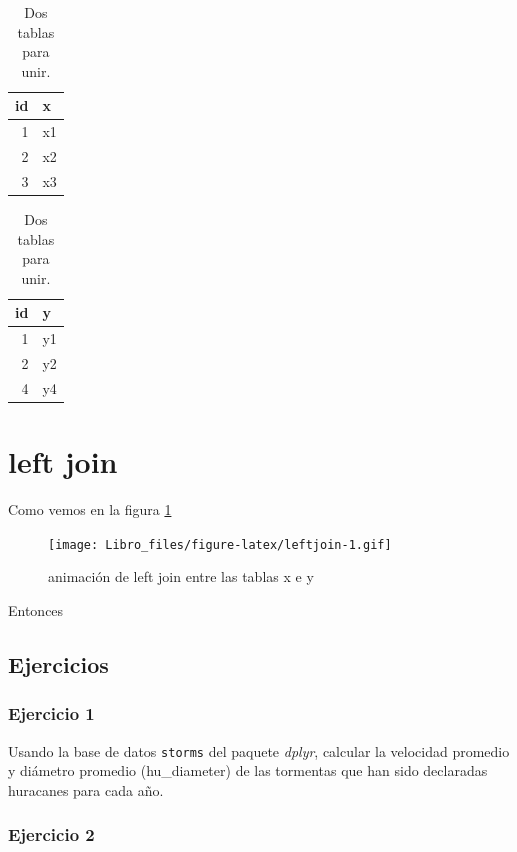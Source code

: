 \documentclass[]{book}
\begin{document}
\begin{table}
\caption{\label{tab:DosTablas}Dos tablas para unir.}

\centering
\begin{tabular}[t]{rl}
\toprule
id & x\\
\midrule
1 & x1\\
2 & x2\\
3 & x3\\
\bottomrule
\end{tabular}
\centering
\begin{tabular}[t]{rl}
\toprule
id & y\\
\midrule
1 & y1\\
2 & y2\\
4 & y4\\
\bottomrule
\end{tabular}
\end{table}

\hypertarget{left-join}{%
\section{left join}\label{left-join}}

Como vemos en la figura \ref{fig:leftjoin}

\begin{figure}
\centering
\texttt{[image: Libro\_files/figure-latex/leftjoin-1.gif]}
\caption{\label{fig:leftjoin}animación de left join entre las tablas x e y}
\end{figure}

Entonces

\hypertarget{ejercicios}{%
\subsection{Ejercicios}\label{ejercicios}}

\hypertarget{ejercicio-1}{%
\subsubsection{Ejercicio 1}\label{ejercicio-1}}

Usando la base de datos \texttt{storms} del paquete \emph{dplyr},
calcular la velocidad promedio y diámetro promedio (hu\_diameter) de las
tormentas que han sido declaradas huracanes para cada año.

\hypertarget{ejercicio-2}{%
\subsubsection{Ejercicio 2}\label{ejercicio-2}}
\end{document}
